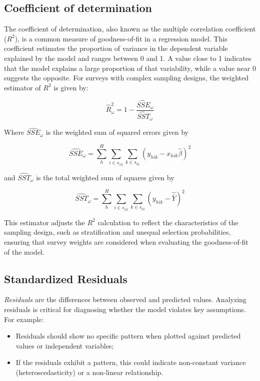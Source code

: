 \documentclass[
  12pt,
]{book}
\begin{document}
\hypertarget{coefficient-of-determination}{%
\subsection{Coefficient of determination}\label{coefficient-of-determination}}

The coefficient of determination, also known as the multiple correlation coefficient (\(R^{2}\)), is a common measure of goodness-of-fit in a regression model. This coefficient estimates the proportion of variance in the dependent variable explained by the model and ranges between 0 and 1. A value close to 1 indicates that the model explains a large proportion of that variability, while a value near 0 suggests the opposite. For surveys with complex sampling designs, the weighted estimator of \(R^{2}\) is given by:

\[
\widehat{R}_{\omega}^{2} = 1 - \frac{\widehat{SSE}_{\omega}} {\widehat{SST}_{\omega}}
\]

Where \(\widehat{SSE}_{\omega}\) is the weighted sum of squared errors given by

\[
\widehat{SSE}_{\omega} = \sum_{h}^{H} \sum_{i \in s_{1h}} \sum_{k \in s_{hi}} \left(y_{hik} - x_{hik} \widehat{\beta}\right)^{2}
\]

and \(\widehat{SST}_{\omega}\) is the total weighted sum of squares given by

\[
\widehat{SST}_{\omega} = \sum_{h}^{H} \sum_{i \in s_{1h}} \sum_{k \in s_{hi}} \left(y_{hik} - \widehat{\overline Y} \right)^{2}
\]

This estimator adjusts the \(R^{2}\) calculation to reflect the characteristics of the sampling design, such as stratification and unequal selection probabilities, ensuring that survey weights are considered when evaluating the goodness-of-fit of the model.

\hypertarget{standardized-residuals}{%
\subsection{Standardized Residuals}\label{standardized-residuals}}

\emph{Residuals} are the differences between observed and predicted values. Analyzing residuals is critical for diagnosing whether the model violates key assumptions. For example:

\begin{itemize}
\item
  Residuals should show no specific pattern when plotted against predicted values or independent variables;
\item
  If the residuals exhibit a pattern, this could indicate non-constant variance (heteroscedasticity) or a non-linear relationship.
\end{itemize}
\end{document}
